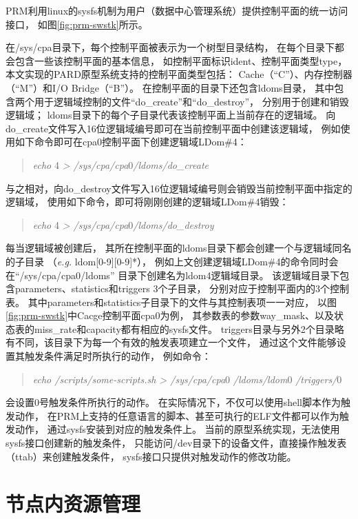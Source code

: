PRM利用linux的sysfs机制为用户（数据中心管理系统）提供控制平面的统一访问接口，
如图\ref{fig:prm-swstk}所示。

在/sys/cpa目录下，每个控制平面被表示为一个树型目录结构，
在每个目录下都会包含一些该控制平面的基本信息，
如控制平面标识ident、控制平面类型type，
本文实现的PARD原型系统支持的控制平面类型包括：
Cache（``C''）、内存控制器（``M''）和I/O Bridge（``B''）。
在控制平面的目录下还包含ldoms目录，
其中包含两个用于逻辑域控制的文件``do\_create''和``do\_destroy''，
分别用于创建和销毁逻辑域；
ldoms目录下的每个子目录代表该控制平面上当前存在的逻辑域。
向do\_create文件写入16位逻辑域编号即可在当前控制平面中创建该逻辑域，
例如使用如下命令即可在cpa0控制平面下创建逻辑域LDom\#4：
\begin{verse}
\textit{echo} 4 \textit{> /sys/cpa/cpa}0\textit{/ldoms/do\_create}
\end{verse}
与之相对，向do\_destroy文件写入16位逻辑域编号则会销毁当前控制平面中指定的逻辑域，
使用如下命令，即可将刚刚创建的逻辑域LDom\#4销毁：
\begin{verse}
\textit{echo} 4 \textit{> /sys/cpa/cpa}0\textit{/ldoms/do\_destroy}
\end{verse}

每当逻辑域被创建后，
其所在控制平面的ldoms目录下都会创建一个与逻辑域同名的子目录
（\textit{e.g.} ldom[0-9][0-9]*），
例如上文创建逻辑域LDom\#4的命令同时会在``/sys/cpa/cpa0/ldoms''
目录下创建名为ldom4逻辑域目录。
该逻辑域目录下包含parameters、statistics和triggers 3个子目录，
分别对应于控制平面内的3个控制表。
其中parameters和statistics子目录下的文件与其控制表项一一对应，
以图\ref{fig:prm-swstk}中Cacge控制平面cpa0为例，
其参数表的参数way\_mask、以及状态表的miss\_rate和capacity都有相应的sysfs文件。
triggers目录与另外2个目录略有不同，该目录下为每一个有效的触发表项建立一个文件，
通过这个文件能够设置其触发条件满足时所执行的动作，
例如命令：
\begin{verse}
\textit{echo /scripts/some-scripts.sh > /sys/cpa/cpa}0
\textit{/ldoms/ldom}0
\textit{/triggers/}0
\end{verse}
会设置0号触发条件所执行的动作。
在实际情况下，不仅可以使用shell脚本作为触发动作，
在PRM上支持的任意语言的脚本、甚至可执行的ELF文件都可以作为触发动作，
通过sysfs安装到对应的触发条件上。
当前的原型系统实现，无法使用sysfs接口创建新的触发条件，
只能访问/dev目录下的设备文件，直接操作触发表（ttab）来创建触发条件，
sysfs接口只提供对触发动作的修改功能。


\section{节点内资源管理}

